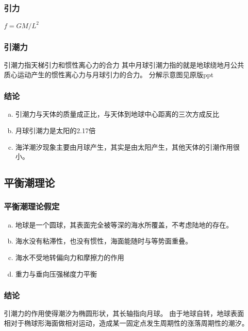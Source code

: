 			\subsubsection{引力}
			$f = GM/L^2$
			\subsubsection{引潮力}
			引潮力指天梯引力和惯性离心力的合力
			其中月球引潮力指的就是地球绕地月公共质心运动产生的惯性离心力与月球引力的合力。
			分解示意图见原版ppt
			\subsubsection{结论}
			\begin{enumerate}[a)]
				\item 引潮力与天体的质量成正比，与天体到地球中心距离的三次方成反比
				\item 月球引潮力是太阳的2.17倍
				\item 海洋潮汐现象主要由月球产生，其实是由太阳产生，其他天体的引潮作用很小。
			\end{enumerate}
				\subsection{平衡潮理论}
				\subsubsection{平衡潮理论假定}
				\begin{enumerate}[a)]
					\item 地球是一个圆球，其表面完全被等深的海水所覆盖，不考虑陆地的存在。
					\item 海水没有粘滞性，也没有惯性，海面能随时与等势面重叠。
					\item 海水不受地转偏向力和摩擦力的作用
					\item 重力与垂向压强梯度力平衡
				\end{enumerate}
				
				\subsubsection{结论}
				引潮力的作用使得潮汐为椭圆形状，其长轴指向月球。
				由于地球自转，地球表面相对于椭球形海面做相对运动，造成某一固定点发生周期性的涨落周期性的潮汐。
				
